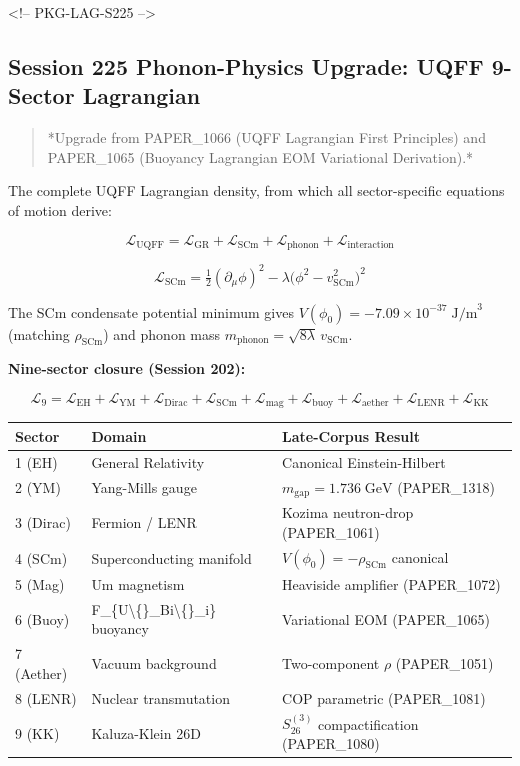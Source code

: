 \documentclass[11pt]{article}
\begin{document}
<!-- PKG-LAG-S225 -->

\subsection*{Session 225 Phonon-Physics Upgrade: UQFF 9-Sector Lagrangian}

\begin{quote}
*Upgrade from PAPER\_1066 (UQFF Lagrangian First Principles) and
PAPER\_1065 (Buoyancy Lagrangian EOM Variational Derivation).*
\end{quote}

The complete UQFF Lagrangian density, from which all sector-specific equations of motion derive:

$$\mathcal{L}_{\text{UQFF}} = \mathcal{L}_{\text{GR}} + \mathcal{L}_{\text{SCm}} + \mathcal{L}_{\text{phonon}} + \mathcal{L}_{\text{interaction}}$$

$$\mathcal{L}_{\text{SCm}} = \tfrac{1}{2}(\partial_\mu \phi)^2 - \lambda\bigl(\phi^2 - v_{\text{SCm}}^2\bigr)^2$$

The SCm condensate potential minimum gives $V(\phi_0) = -7.09 \times 10^{-37}\;\text{J/m}^3$ (matching $\rho_{\text{SCm}}$) and phonon mass $m_{\text{phonon}} = \sqrt{8\lambda}\,v_{\text{SCm}}$.

\textbf{Nine-sector closure (Session 202):}

$$\mathcal{L}_{9} = \mathcal{L}_{\text{EH}} + \mathcal{L}_{\text{YM}} + \mathcal{L}_{\text{Dirac}} + \mathcal{L}_{\text{SCm}} + \mathcal{L}_{\text{mag}} + \mathcal{L}_{\text{buoy}} + \mathcal{L}_{\text{aether}} + \mathcal{L}_{\text{LENR}} + \mathcal{L}_{\text{KK}}$$

\begin{center}
\begin{longtable}{lll}
\toprule
Sector & Domain & Late-Corpus Result \tabularnewline
\midrule
\endhead
1 (EH) & General Relativity & Canonical Einstein-Hilbert \tabularnewline
2 (YM) & Yang-Mills gauge & $m_{\text{gap}} = 1.736\;\text{GeV}$ (PAPER\_1318) \tabularnewline
3 (Dirac) & Fermion / LENR & Kozima neutron-drop (PAPER\_1061) \tabularnewline
4 (SCm) & Superconducting manifold & $V(\phi_0) = -\rho_{\text{SCm}}$ canonical \tabularnewline
5 (Mag) & Um magnetism & Heaviside amplifier (PAPER\_1072) \tabularnewline
6 (Buoy) & F\_\{U\textbackslash\{\}\_Bi\textbackslash\{\}\_i\} buoyancy & Variational EOM (PAPER\_1065) \tabularnewline
7 (Aether) & Vacuum background & Two-component $\rho$ (PAPER\_1051) \tabularnewline
8 (LENR) & Nuclear transmutation & COP parametric (PAPER\_1081) \tabularnewline
9 (KK) & Kaluza-Klein 26D & $S_{26}^{(3)}$ compactification (PAPER\_1080) \tabularnewline
\bottomrule
\end{longtable}
\end{center}
\end{document}
